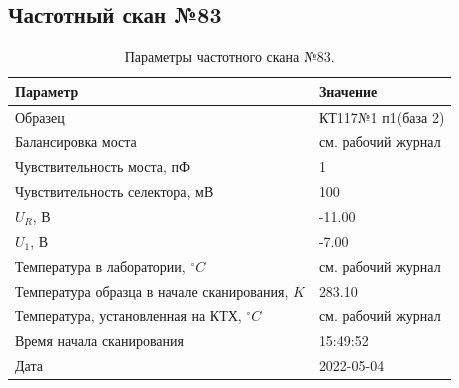 \subsection{Частотный скан №83}
\begin{table}[!ht]
    \centering
    \caption{Параметры частотного скана №83.}
    \begin{tabular}{|l|l|}
        \hline
        Параметр                                       & Значение                  \\ \hline
        Образец                                        & КТ117№1 п1(база 2)        \\ \hline
        Балансировка моста                             & см. рабочий журнал        \\ \hline
        Чувствительность моста, пФ                     & 1                         \\ \hline
        Чувствительность селектора, мВ                 & 100                       \\ \hline
        $U_R$, В                                       & -11.00                    \\ \hline
        $U_1$, В                                       & -7.00                     \\ \hline
        Температура в лаборатории, $^\circ C$          & см. рабочий журнал        \\ \hline
        Температура образца в начале сканирования, $K$ & 283.10                    \\ \hline
        Температура, установленная на КТХ, $^\circ C$  & см. рабочий журнал        \\ \hline
        Время начала сканирования                      & 15:49:52                  \\ \hline
        Дата                                           & 2022-05-04                \\ \hline
    \end{tabular}
    \label{table:frequency_scan_83}
\end{table}

